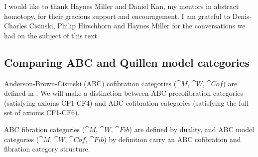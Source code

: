 \bigskip

I would like to thank Haynes Miller and Daniel Kan, my mentors in abstract homotopy, for their gracious support and encouragement. I am grateful to Denis-Charles Cisinski, Philip Hirschhorn and Haynes Miller for the conversations we had on the subject of this text.

\subsection*{Comparing ABC and Quillen model categories}
\label{subsec:compareabcquillen}

Anderson-Brown-Cisinski (ABC) cofibration categories (${\cat M}$, ${\cat W}$, ${\cat Cof}$) are defined in . We will make a distinction between ABC precofibration categories (satisfying axioms CF1-CF4) and ABC cofibration categories (satisfying the full set of axioms CF1-CF6). 

ABC fibration categories (${\cat M}$, ${\cat W}$, ${\cat Fib}$) are defined by duality, and ABC model categories (${\cat M}$, ${\cat W}$, ${\cat Cof}$, ${\cat Fib}$) by definition carry an ABC cofibration and fibration category structure.

